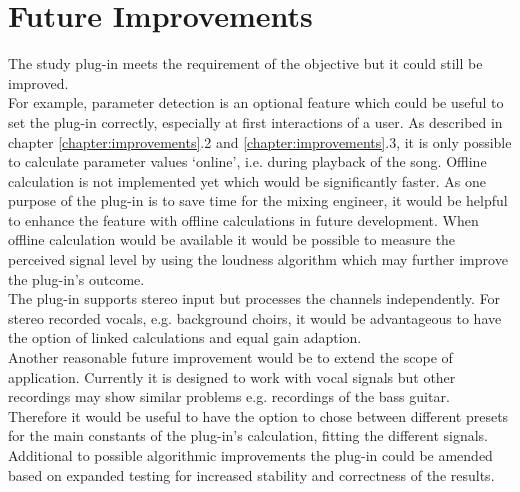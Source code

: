 \chapter{Future Improvements}
\label{chapter:future_improvements}

The study plug-in meets the requirement of the objective but it could still be improved.\\
For example, parameter detection is an optional feature which could be useful to set the plug-in correctly, especially at first interactions of a user. As described in chapter \ref{chapter:improvements}.2 and \ref{chapter:improvements}.3, it is only possible to calculate parameter values ‘online’, i.e. during playback of the song. Offline calculation is not implemented yet which would be significantly faster. As one purpose of the plug-in is to save time for the mixing engineer, it would be helpful to enhance the feature with offline calculations in future development. When offline calculation would be available it would be possible to measure the perceived signal level by using the loudness algorithm\cite{ITUalgo} which may further improve the plug-in’s outcome.\\
The plug-in supports stereo input but processes the channels independently. For stereo recorded vocals, e.g. background choirs, it would be advantageous to have the option of linked calculations and equal gain adaption.\\
Another reasonable future improvement would be to extend the scope of application. Currently it is designed to work with vocal signals but other recordings may show similar problems e.g. recordings of the bass guitar. Therefore it would be useful to have the option to chose between different presets for the main constants of the plug-in’s calculation, fitting the different signals.\\
Additional to possible algorithmic improvements the plug-in could be amended based on expanded testing for increased stability and correctness of the results.\\


